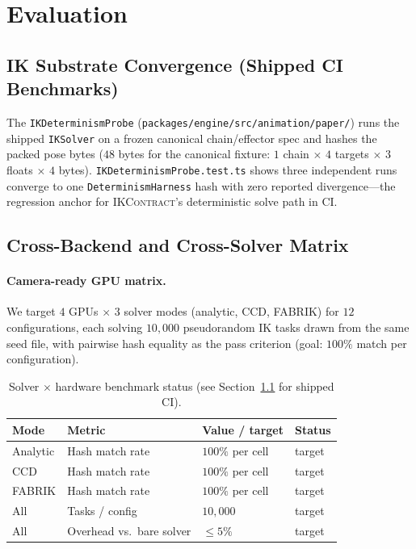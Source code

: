 \documentclass[sigconf,nonacm]{acmart}
\newcommand{\ikcontract}{\textsc{IKContract}}
\newcommand{\fabrik}{\textsc{FABRIK}}
\newcommand{\ccd}{\textsc{CCD}}
\begin{document}
\section{Evaluation}
\label{sec:eval}

\subsection{IK Substrate Convergence (Shipped CI Benchmarks)}
\label{sec:eval:ik-probe}
The \texttt{IKDeterminismProbe} (\texttt{packages/engine/src/animation/paper/})
runs the shipped \texttt{IKSolver} on a frozen canonical chain/effector spec
and hashes the packed pose bytes ($48$ bytes for the canonical fixture:
$1$ chain $\times$ $4$ targets $\times$ $3$ floats $\times$ $4$ bytes).
\texttt{IKDeterminismProbe.test.ts} shows three independent runs converge to
one \texttt{DeterminismHarness} hash with zero reported divergence---the
regression anchor for \ikcontract{}'s deterministic solve path in CI.

\subsection{Cross-Backend and Cross-Solver Matrix}
\label{sec:eval:matrix}
\paragraph{Camera-ready GPU matrix.}
We target $4$ GPUs $\times$ $3$ solver modes (analytic, \ccd{}, \fabrik{})
for $12$ configurations, each solving $10{,}000$ pseudorandom IK tasks drawn
from the same seed file, with pairwise hash equality as the pass criterion (goal: $100\%$ match per configuration).

\begin{table}[t]
  \centering
  \caption{Solver $\times$ hardware benchmark status (see Section~\ref{sec:eval:ik-probe} for shipped CI).}
  \label{tab:ik-matrix}
  \footnotesize
  \begin{tabular}{@{}llll@{}}
    \toprule
    \textbf{Mode} & \textbf{Metric} & \textbf{Value / target} & \textbf{Status} \\
    \midrule
    Analytic & Hash match rate & $100\%$ per cell & target \\
    \ccd{} & Hash match rate & $100\%$ per cell & target \\
    \fabrik{} & Hash match rate & $100\%$ per cell & target \\
    All & Tasks / config & $10{,}000$ & target \\
    All & Overhead vs.\ bare solver & $\leq 5\%$ & target \\
    \bottomrule
  \end{tabular}
\end{table}
\end{document}
